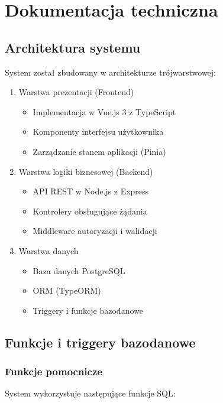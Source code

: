 \documentclass[12pt]{article}
\begin{document}
\section{Dokumentacja techniczna}

\subsection{Architektura systemu}
System został zbudowany w architekturze trójwarstwowej:
\begin{enumerate}
    \item Warstwa prezentacji (Frontend)
    \begin{itemize}
        \item Implementacja w Vue.js 3 z TypeScript
        \item Komponenty interfejsu użytkownika
        \item Zarządzanie stanem aplikacji (Pinia)
    \end{itemize}

    \item Warstwa logiki biznesowej (Backend)
    \begin{itemize}
        \item API REST w Node.js z Express
        \item Kontrolery obsługujące żądania
        \item Middleware autoryzacji i walidacji
    \end{itemize}

    \item Warstwa danych
    \begin{itemize}
        \item Baza danych PostgreSQL
        \item ORM (TypeORM)
        \item Triggery i funkcje bazodanowe
    \end{itemize}
\end{enumerate}
\newpage
\subsection{Funkcje i triggery bazodanowe}

\subsubsection{Funkcje pomocnicze}
System wykorzystuje następujące funkcje SQL:
\end{document}
